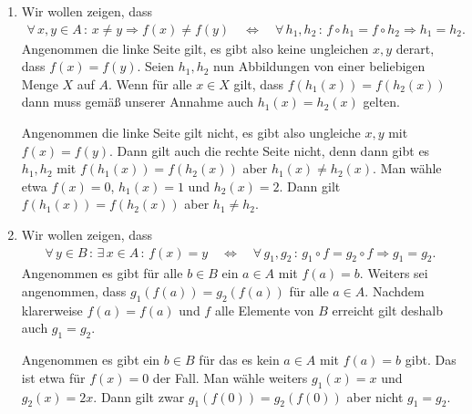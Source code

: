 \documentclass{article}
\begin{document}
\begin{enumerate}
    \item Wir wollen zeigen, dass
    \begin{align*}
        \forall\, x, y \in A\, :\, x \neq y \Rightarrow f(x) \neq f(y) \quad \Longleftrightarrow \quad \forall\, h_1, h_2\, :\, f \circ h_1 = f \circ h_2 \Rightarrow h_1 = h_2.
    \end{align*}
    Angenommen die linke Seite gilt, es gibt also keine ungleichen $x, y$ derart, dass $f(x) = f(y)$. Seien $h_1, h_2$ nun Abbildungen von einer beliebigen Menge $X$ auf $A$. Wenn für alle $x \in X$ gilt, dass $f(h_1(x)) = f(h_2(x))$ dann muss gemäß unserer Annahme auch $h_1(x) = h_2(x)$ gelten.

    Angenommen die linke Seite gilt nicht, es gibt also ungleiche $x, y$ mit $f(x) = f(y)$. Dann gilt auch die rechte Seite nicht, denn dann gibt es $h_1, h_2$ mit $f(h_1(x)) = f(h_2(x))$ aber $h_1(x) \neq h_2(x)$. Man wähle etwa $f(x) = 0$, $h_1(x) = 1$ und $h_2(x) = 2$. Dann gilt $f(h_1(x)) = f(h_2(x))$ aber $h_1 \neq h_2$.

    \item Wir wollen zeigen, dass
    \begin{align*}
        \forall\, y \in B\, :\, \exists\, x \in A\, :\, f(x) = y \quad \Longleftrightarrow \quad \forall\, g_1, g_2\, :\, g_1 \circ f = g_2 \circ f \Rightarrow g_1 = g_2.
    \end{align*}
    Angenommen es gibt für alle $b \in B$ ein $a \in A$ mit $f(a) = b$. Weiters sei angenommen, dass $g_1(f(a)) = g_2(f(a))$ für alle $a \in A$. Nachdem klarerweise $f(a) = f(a)$ und $f$ alle Elemente von $B$ erreicht gilt deshalb auch $g_1 = g_2$.

    Angenommen es gibt ein $b \in B$ für das es kein $a \in A$ mit $f(a) = b$ gibt. Das ist etwa für $f(x) = 0$ der Fall. Man wähle weiters $g_1(x) = x$ und $g_2(x) = 2x$. Dann gilt zwar $g_1(f(0)) = g_2(f(0))$ aber nicht $g_1 = g_2$.
\end{enumerate}
\end{document}
